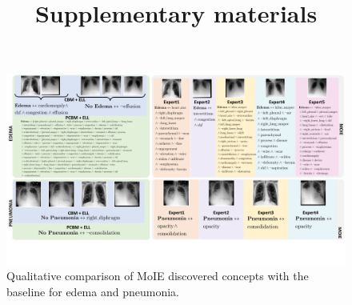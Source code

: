\documentclass[runningheads]{llncs}
\begin{document}
%
\title{Supplementary materials}
%
%
%
%
\maketitle              %
%
%
%
\begin{figure}[h]
\begin{center}
\centerline{\includegraphics[width=\linewidth]{plots/supp/Supp_qual.pdf}}
\caption{Qualitative comparison of MoIE discovered concepts with the baseline for edema and pneumonia.}
\label{fig:expert_performance_cv_vit}
\end{center}
\end{figure}
\end{document}

